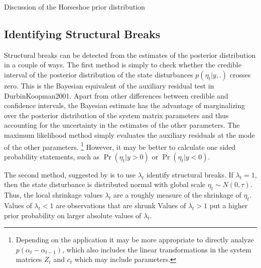 \documentclass{article}
\begin{document}
Discussion of the Horseshoe prior distribution



\subsection{Identifying Structural Breaks}

Structural breaks can be detected from the estimates of the  posterior distribution in a couple of ways.
The first method is simply to check whether the credible interval of the posterior distribution of the state disturbances $p(\eta_{t} | y, .)$ crosses zero.
This is the Bayesian equivalent of the auxiliary residual test in \textcite{JongPenzer1998}{DurbinKoopman2001}.%
Apart from other differences between credible and confidence intervals, the Bayesian estimate has the advantage of marginalizing over the posterior distribution of the system matrix parameters and thus accounting for the  uncertainty in the estimates of the other parameters.
The maximum likelihood method simply evaluates the auxiliary residuals at the mode of the other parameters.%
\footnote{Depending on the application it may be more appropriate to directly analyze $p(\alpha_{t} - \alpha_{t-1})$, which also includes the linear transformations in the system matrices $Z_{t}$ and $c_{t}$ which may include parameters.}
However, it may be better to calculate one sided probability statements, such as $\Pr(\eta_{t} | y > 0)$ or $\Pr(\eta_{t} | y <0)$.

The second method, suggested by \textcite[179-180]{PetrisPetroneEtAl2009} is to use $\lambda_{t}$ identify structural breaks.
If $\lambda_{t} = 1$, then the state disturbance is distributed normal with global scale $\eta_{t} \sim N(0, \tau)$.
Thus, the local shrinkage values $\lambda_{t}$ are a roughly measure of the shrinkage of $\eta_{t}$.
Values of $\lambda_{t} < 1$ are observations that are shrunk
Values of $\lambda_{t} > 1$ put a higher prior probability on larger absolute values of $\lambda_{t}$.
\end{document}
